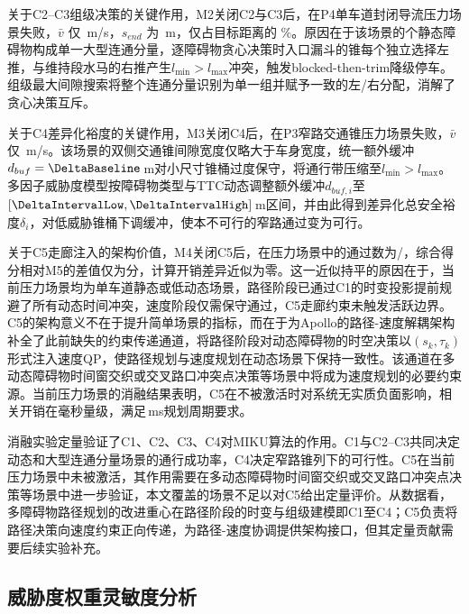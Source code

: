 关于C2--C3组级决策的关键作用，M2关闭C2与C3后，在P4单车道封闭导流压力场景失败，$\bar v$ 仅 \AblationMTwoScFourVAvg\,m/s，$s_{end}$ 为 \AblationMTwoScFourSEnd\,m，仅占目标距离的 \AblationMTwoScFourSEndPct\%。原因在于该场景的\DenseConstructionTotalObstacles{}个静态障碍物构成单一大型连通分量，逐障碍物贪心决策时入口漏斗的\DenseConstructionEntranceCones{}锥每个独立选择左推，与维持段水马的右推产生$l_{\min} > l_{\max}$冲突，触发blocked-then-trim降级停车。组级最大间隙搜索将整个连通分量识别为单一组并赋予一致的左/右分配，消解了贪心决策互斥。

关于C4差异化裕度的关键作用，M3关闭C4后，在P3窄路交通锥压力场景失败，$\bar v$ 仅 \AblationMThreeScThreeVAvg\,m/s。该场景的双侧交通锥间隙宽度仅略大于车身宽度，统一额外缓冲$d_{buf}=\DeltaBaseline$\,m对小尺寸锥桶过度保守，将通行带压缩至$l_{\min} > l_{\max}$。多因子威胁度模型按障碍物类型与TTC动态调整额外缓冲$d_{buf,i}$至$[\DeltaIntervalLow, \DeltaIntervalHigh]$\,m区间，并由此得到差异化总安全裕度$\delta_i$，对低威胁锥桶下调缓冲，使本不可行的窄路通过变为可行。

关于C5走廊注入的架构价值，M4关闭C5后，在压力场景中的通过数为\AblationMFourPassCount{}/\AblationScenarioTotal，综合得分相对M5的差值仅为\AblationMarginMFourMFive 分，计算开销差异近似为零。这一近似持平的原因在于，当前压力场景均为单车道静态或低动态场景，路径阶段已通过C1的时变投影提前规避了所有动态时间冲突，速度阶段仅需保守通过，C5走廊约束未触发活跃边界。C5的架构意义不在于提升简单场景的指标，而在于为Apollo的路径-速度解耦架构补全了此前缺失的约束传递通道，将路径阶段对动态障碍物的时空决策以$(s_k,\tau_k)$形式注入速度QP，使路径规划与速度规划在动态场景下保持一致性。该通道在多动态障碍物时间窗交织或交叉路口冲突点决策等场景中将成为速度规划的必要约束源。当前压力场景的消融结果表明，C5在不被激活时对系统无实质负面影响，相关开销在毫秒量级，满足\PlannerCycleMs\,ms规划周期要求。

消融实验定量验证了C1、C2、C3、C4对MIKU算法的作用。C1与C2--C3共同决定动态和大型连通分量场景的通行成功率，C4决定窄路锥列下的可行性。C5在当前压力场景中未被激活，其作用需要在多动态障碍物时间窗交织或交叉路口冲突点决策等场景中进一步验证，本文覆盖的场景不足以对C5给出定量评价。从数据看，多障碍物路径规划的改进重心在路径阶段的时变与组级建模即C1至C4；C5负责将路径决策向速度约束正向传递，为路径-速度协调提供架构接口，但其定量贡献需要后续实验补充。

\subsection{威胁度权重灵敏度分析}
\label{sec:sensitivity_exp}

